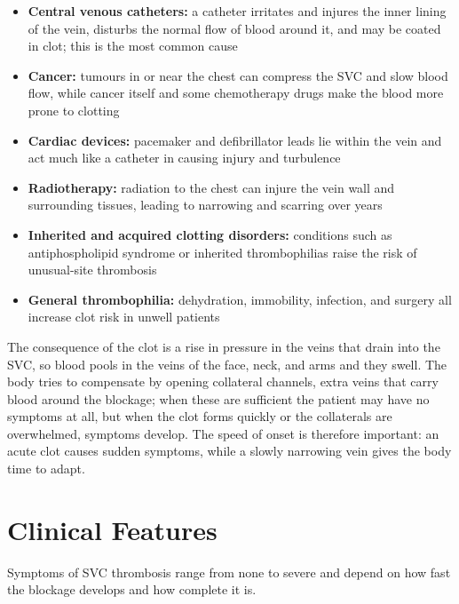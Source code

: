 \begin{itemize}
    \item \textbf{Central venous catheters:} a catheter irritates and injures the inner lining of the vein, disturbs the normal flow of blood around it, and may be coated in clot; this is the most common cause
    \item \textbf{Cancer:} tumours in or near the chest can compress the SVC and slow blood flow, while cancer itself and some chemotherapy drugs make the blood more prone to clotting
    \item \textbf{Cardiac devices:} pacemaker and defibrillator leads lie within the vein and act much like a catheter in causing injury and turbulence
    \item \textbf{Radiotherapy:} radiation to the chest can injure the vein wall and surrounding tissues, leading to narrowing and scarring over years
    \item \textbf{Inherited and acquired clotting disorders:} conditions such as antiphospholipid syndrome or inherited thrombophilias raise the risk of unusual-site thrombosis
    \item \textbf{General thrombophilia:} dehydration, immobility, infection, and surgery all increase clot risk in unwell patients
\end{itemize}

The consequence of the clot is a rise in pressure in the veins that drain into the SVC, so blood pools in the veins of the face, neck, and arms and they swell. The body tries to compensate by opening collateral channels, extra veins that carry blood around the blockage; when these are sufficient the patient may have no symptoms at all, but when the clot forms quickly or the collaterals are overwhelmed, symptoms develop. The speed of onset is therefore important: an acute clot causes sudden symptoms, while a slowly narrowing vein gives the body time to adapt.

\section*{Clinical Features}
Symptoms of SVC thrombosis range from none to severe and depend on how fast the blockage develops and how complete it is.

